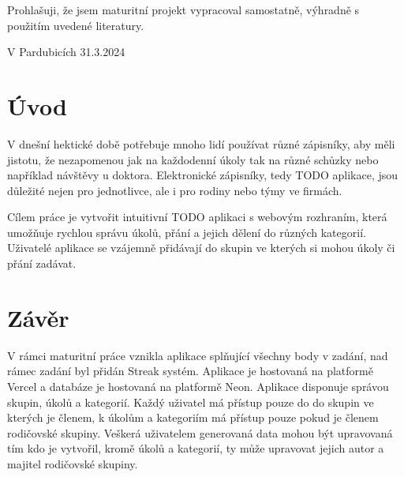 \documentclass[a4paper,12pt]{report}
\begin{document}

\pagebreak
\vspace*{\fill}
Prohlašuji, že jsem maturitní projekt vypracoval samostatně, výhradně s použitím uvedené literatury.

V Pardubicích 31.3.2024

\pagebreak
\renewcommand{\contentsname}{\centering Obsah}
\tableofcontents
\pagebreak

\setcounter{page}{1}
\setcounter{section}{1}
\chapter{Úvod}
V dnešní hektické době potřebuje mnoho lidí používat různé zápisníky, aby měli jistotu, že nezapomenou jak na každodenní úkoly tak na různé schůzky nebo například návštěvy u doktora. Elektronické zápisníky, tedy TODO aplikace, jsou důležité nejen pro jednotlivce, ale i pro rodiny nebo týmy ve firmách.

Cílem práce je vytvořit intuitivní TODO aplikaci s webovým rozhraním, která umožňuje rychlou správu úkolů, přání a jejich dělení do různých kategorií. Uživatelé aplikace se vzájemně přidávají do skupin ve kterých si mohou úkoly či přání zadávat.





\chapter{Závěr}
V rámci maturitní práce vznikla aplikace splňující všechny body v zadání, nad rámec zadání byl přidán Streak systém. Aplikace je hostovaná na platformě Vercel\cite{vercel} a databáze je hostovaná na platformě Neon\cite{neon}. Aplikace disponuje správou skupin, úkolů a kategorií. Každý uživatel má přístup pouze do do skupin ve kterých je členem, k úkolům a kategoriím má přístup pouze pokud je členem rodičovské skupiny. Veškerá uživatelem generovaná data mohou být upravovaná tím kdo je vytvořil, kromě úkolů a kategorií, ty může upravovat jejich autor a majitel rodičovské skupiny. 
\end{document}
